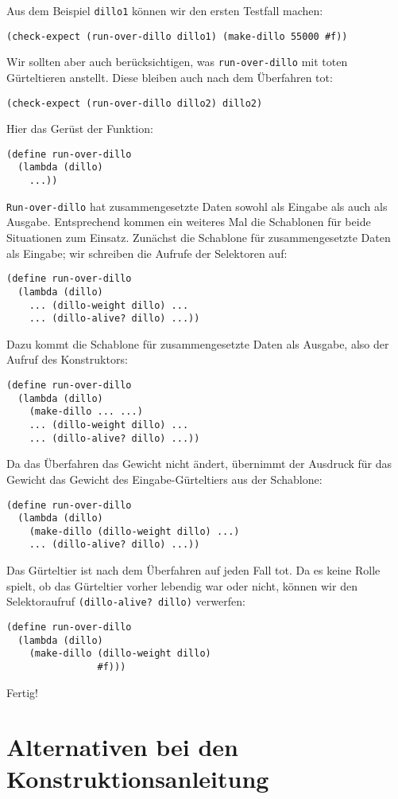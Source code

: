 %
Aus dem Beispiel \lstinline{dillo1} können wir den ersten Testfall machen:
%
\begin{lstlisting}
(check-expect (run-over-dillo dillo1) (make-dillo 55000 #f))
\end{lstlisting}
%
Wir sollten aber auch berücksichtigen, was \lstinline{run-over-dillo} mit
toten Gürteltieren anstellt.  Diese bleiben auch nach dem Überfahren
tot:
%
\begin{lstlisting}
(check-expect (run-over-dillo dillo2) dillo2)
\end{lstlisting}
%
Hier das Gerüst der Funktion:
%
\begin{lstlisting}
(define run-over-dillo
  (lambda (dillo)
    ...))
\end{lstlisting}
%
\lstinline{Run-over-dillo} hat zusammengesetzte Daten sowohl als Eingabe
als auch als Ausgabe.  Entsprechend kommen ein weiteres Mal die
Schablonen für beide Situationen zum Einsatz.  Zunächst die Schablone
für zusammengesetzte Daten als Eingabe; wir schreiben die Aufrufe der
Selektoren auf:
%
\begin{lstlisting}
(define run-over-dillo
  (lambda (dillo)
    ... (dillo-weight dillo) ...
    ... (dillo-alive? dillo) ...))
\end{lstlisting}
%
Dazu kommt die Schablone für zusammengesetzte Daten als Ausgabe, also
der Aufruf des Konstruktors:
%
\begin{lstlisting}
(define run-over-dillo
  (lambda (dillo)
    (make-dillo ... ...)
    ... (dillo-weight dillo) ...
    ... (dillo-alive? dillo) ...))
\end{lstlisting}
%
Da das Überfahren das Gewicht nicht ändert, übernimmt
der Ausdruck für das Gewicht das Gewicht des Eingabe-Gürteltiers aus
der Schablone:
%
\begin{lstlisting}
(define run-over-dillo
  (lambda (dillo)
    (make-dillo (dillo-weight dillo) ...)
    ... (dillo-alive? dillo) ...))
\end{lstlisting}
%
Das Gürteltier ist nach dem Überfahren auf jeden Fall tot.  Da es
keine Rolle spielt, ob das Gürteltier vorher lebendig war oder nicht,
können wir den Selektoraufruf \lstinline{(dillo-alive? dillo)} verwerfen:
%
\begin{lstlisting}
(define run-over-dillo
  (lambda (dillo)
    (make-dillo (dillo-weight dillo)
                #f)))
\end{lstlisting}
%
Fertig!

\section{Alternativen bei den Konstruktionsanleitung}

